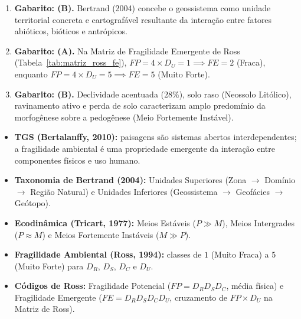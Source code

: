 \begin{boxGabarito}
\begin{enumerate}[leftmargin=1.8em, itemsep=3.5pt]
  \item \textbf{Gabarito: (B).} Bertrand (2004) concebe o geossistema como unidade territorial concreta e cartografável resultante da interação entre fatores abióticos, bióticos e antrópicos.

  \item \textbf{Gabarito: (A).} Na Matriz de Fragilidade Emergente de Ross (Tabela~\ref{tab:matriz_ross_fe}), $FP=4 \times D_U=1 \implies FE=2$ (Fraca), enquanto $FP=4 \times D_U=5 \implies FE=5$ (Muito Forte).

  \item \textbf{Gabarito: (B).} Declividade acentuada ($28\%$), solo raso (Neossolo Litólico), ravinamento ativo e perda de solo caracterizam amplo predomínio da morfogênese sobre a pedogênese (Meio Fortemente Instável).
\end{enumerate}
\end{boxGabarito}

\begin{boxResumo}
\begin{itemize}[leftmargin=1.4em, itemsep=2.5pt]
  \item \textbf{TGS (Bertalanffy, 2010):} paisagens são sistemas abertos interdependentes; a fragilidade ambiental é uma propriedade emergente da interação entre componentes físicos e uso humano.
  \item \textbf{Taxonomia de Bertrand (2004):} Unidades Superiores (Zona $\to$ Domínio $\to$ Região Natural) e Unidades Inferiores (Geossistema $\to$ Geofácies $\to$ Geótopo).
  \item \textbf{Ecodinâmica (Tricart, 1977):} Meios Estáveis ($P \gg M$), Meios Intergrades ($P \approx M$) e Meios Fortemente Instáveis ($M \gg P$).
  \item \textbf{Fragilidade Ambiental (Ross, 1994):} classes de $1$ (Muito Fraca) a $5$ (Muito Forte) para $D_R$, $D_S$, $D_C$ e $D_U$.
  \item \textbf{Códigos de Ross:} Fragilidade Potencial ($FP = D_R D_S D_C$, média física) e Fragilidade Emergente ($FE = D_R D_S D_C D_U$, cruzamento de $FP \times D_U$ na Matriz de Ross).
\end{itemize}
\end{boxResumo}

